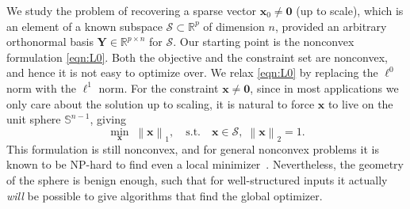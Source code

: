 \documentclass[11pt, journal, final]{IEEEtran}
\numberwithin{equation}{section}
\newcommand{\R}{\mathbb{R}}
\newcommand{\mb}{\mathbf}
\newcommand{\mc}{\mathcal}
\newcommand{\bb}{\mathbb}
\newcommand{\norm}[1]{\left\lVert#1\right\rVert}
\begin{document}
{We study the problem of recovering a sparse vector $\mb x_0 \ne \mb 0$ (up to scale), which is an element of a known subspace $\mc S \subset \R^p$ of dimension $n$, provided an arbitrary orthonormal basis $\mb Y \in \R^{p \times n}$ for $\mc S$.
Our starting point is the nonconvex formulation \eqref{eqn:L0}. Both the objective and the constraint set are nonconvex, and hence it is not easy to optimize over. We relax \eqref{eqn:L0} by replacing the $\ell^0$ norm with the $\ell^1$ norm. For the constraint $\mb x \ne \mb 0$, since in most applications we only care about the solution up to scaling, it is natural to force $\mb x$ to live on the unit sphere $\bb S^{n-1}$, giving
\begin{equation} \label{eqn:l1-l2}
\min_{\mb x} \; \norm{\mb x }_1, \quad \text{s.t.} \quad \mb x \in \mc S, \; \norm{\mb x}_{2} = 1.
\end{equation}
This formulation is still nonconvex, and for general nonconvex problems it is known to be NP-hard to find even a local minimizer~\cite{murty1987some}. Nevertheless, the geometry of the sphere is benign enough, such that for well-structured inputs it actually {\em will} be possible to give algorithms that find the global optimizer.

}
\end{document}

